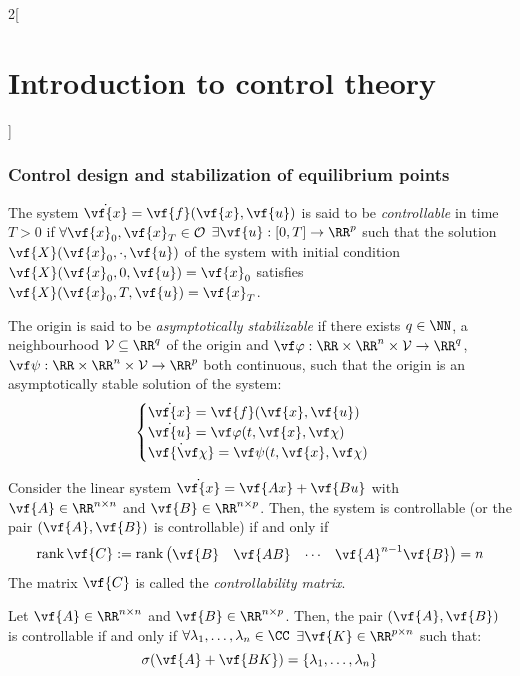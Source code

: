 \documentclass[../../../main_math.tex]{subfiles}
\begin{document}
\begin{multicols}{2}[\section{Introduction to control theory}]
  \subsubsection{Control design and stabilization of equilibrium points}
  \begin{definition}
    The system $\dot{\vf{x}} = \vf{f}(\vf{x}, \vf{u})$ is said to be \emph{controllable} in time $T>0$ if $\forall \vf{x}_0, \vf{x}_T\in \mathcal{O}$ $\exists \vf{u}: [0, T]\to \RR^p$ such that the solution $\vf{X}(\vf{x}_0,\cdot, \vf{u})$ of the system with initial condition $\vf{X}(\vf{x}_0, 0,\vf{u}) = \vf{x}_0$ satisfies $\vf{X}(\vf{x}_0, T,\vf{u}) = \vf{x}_T$.
  \end{definition}
  \begin{definition}
    The origin is said to be \emph{asymptotically stabilizable} if there exists $q\in \NN$, a neighbourhood $\mathcal{V}\subseteq \RR^q$ of the origin and $\vf\varphi:\RR\times\RR^n\times\mathcal{V}\to \RR^q$, $\vf\psi:\RR\times\RR^n\times\mathcal{V}\to \RR^p$ both continuous, such that the origin is an asymptotically stable solution of the system:
    \begin{equation}\label{ICT:augmented_system}
      \begin{cases}
        \dot{\vf{x}} = \vf{f}(\vf{x}, \vf{u})         \\
        \dot{\vf{u}} = \vf\varphi(t, \vf{x}, \vf\chi) \\
        \dot{\vf{\vf\chi}} = \vf\psi(t, \vf{x}, \vf\chi)
      \end{cases}
    \end{equation}
  \end{definition}
  \begin{theorem}
    Consider the linear system $\dot{\vf{x}} = \vf{Ax} + \vf{Bu}$ with $\vf{A}\in \RR^{n\times n}$ and $\vf{B}\in \RR^{n\times p}$. Then, the system is controllable (or the pair $(\vf{A},\vf{B})$ is controllable) if and only if
    $$
      \rank\vf{C}:=\rank\begin{pmatrix} \vf{B} & \vf{AB} & \cdots & \vf{A}^{n-1}\vf{B} \end{pmatrix} = n
    $$
    The matrix $\vf{C}$ is called the \emph{controllability matrix}.
  \end{theorem}
  \begin{theorem}
    Let $\vf{A} \in \RR^{n\times n}$ and $\vf{B}\in \RR^{n\times p}$. Then, the pair $(\vf{A}, \vf{B})$ is controllable if and only if $\forall \lambda_1,\ldots,\lambda_n\in \CC$ $\exists \vf{K}\in \RR^{p\times n}$ such that: $$\sigma(\vf{A}+\vf{BK})=\{\lambda_1,\ldots,\lambda_n\}$$

\end{theorem}
\end{multicols}
\end{document}
